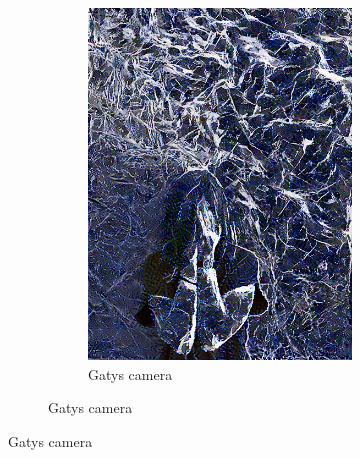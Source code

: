 \begin{figure}[]
\begin{subfigure}{\textwidth}
\begin{subfigure}{0.24\textwidth}
            \includegraphics[width=\textwidth]{images/04-experiment02/human/marble/gatys_proj.jpg}
            \caption*{Gatys camera}
        \end{subfigure}
        

\end{subfigure}
\end{figure}
